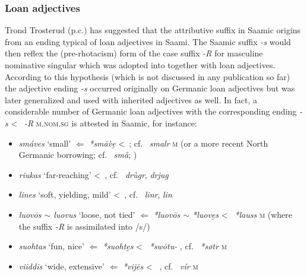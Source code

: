 {\subsubsection{Loan adjectives} 
Trond Trosterud (p.c.) has suggested that the attributive suffix in Saamic origins from an ending typical of  loan adjectives in Saami. The Saamic suffix \textit{-s} would then reflex the (pre-rhotacism) form of the  case suffix \textit{-R} for masculine nominative singular which was adopted into  together with loan adjectives. According to this hypothesis (which is not discussed in any publication so far) the adjective ending \mbox{\textit{-s}} occurred originally on Germanic loan adjectives but was later generalized and used with inherited adjectives as well. In fact, a considerable number of Germanic loan adjectives with the corresponding ending \textit{-s} <~ \textit{-R} \textsc{m.nom.sg} is attested in Saamic, for instance:
\begin{itemize}
\item {} \textit{smáves} ‘small’ $\Leftarrow$  \textit{*smāv̀e̮} <~; cf.~ \textit{smalr} \textsc{m} (or a more recent North Germanic borrowing; cf.~ \textit{sm\aa}; \citealt[263]{sammallahti1998b})
\item {} \textit{riukas} ‘far-reaching’ <~, cf.~ \textit{drùgr},  \textit{drjug} \cite[267]{qvigstad1893}
\item {} \textit{lines} ‘soft, yielding, mild’ <~, cf.~ \textit{linr},  \textit{lin} \cite[218]{qvigstad1893}
\item {} \textit{luov\.{o}s $\sim$ luovus} ‘loose, not tied’ $\Leftarrow$  \textit{*luovōs $\sim$ *luove̮s} <~ \textit{*lauss} \textsc{m} (where the suffix \textit{-R} is assimilated into /s/) \cite[264]{sammallahti1998b}
\item {} \textit{suohtas} ‘fun, nice’ $\Leftarrow$  \textit{*suohte̮s} <~ \textit{*swōtu-} \cite[264]{sammallahti1998b}, cf.~ \textit{*søtr} \textsc{m} 
\item {} \textit{viiddis} ‘wide, extensive’ $\Leftarrow$  \textit{*vij{\dh}ēs} <~ \cite[148–149]{lehtiranta1989}, cf.~ \textit{v\'i{\dh}r} \textsc{m}

\end{itemize}}
